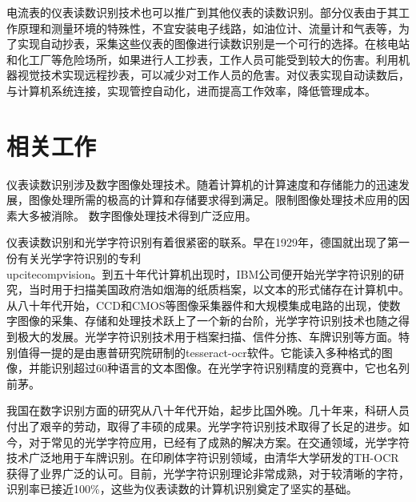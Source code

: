 电流表的仪表读数识别技术也可以推广到其他仪表的读数识别。部分仪表由于其工作原理和测量环境的特殊性，不宜安装电子线路，如油位计、流量计和气表等，为了实现自动抄表，采集这些仪表的图像进行读数识别是一个可行的选择。在核电站和化工厂等危险场所，如果进行人工抄表，工作人员可能受到较大的伤害。利用机器视觉技术实现远程抄表，可以减少对工作人员的危害。对仪表实现自动读数后，与计算机系统连接，实现管控自动化，进而提高工作效率，降低管理成本。

\section{相关工作}

仪表读数识别涉及数字图像处理技术。随着计算机的计算速度和存储能力的迅速发展，图像处理所需的极高的计算和存储要求得到满足。限制图像处理技术应用的因素大多被消除。 数字图像处理技术得到广泛应用。

仪表读数识别和光学字符识别有着很紧密的联系。早在1929年，德国就出现了第一份有关光学字符识别的专利\\upcite{compvision}。到五十年代计算机出现时，IBM公司便开始光学字符识别的研究，当时用于扫描美国政府浩如烟海的纸质档案，以文本的形式储存在计算机中。从八十年代开始，CCD和CMOS等图像采集器件和大规模集成电路的出现，使数字图像的采集、存储和处理技术跃上了一个新的台阶，光学字符识别技术也随之得到极大的发展。光学字符识别技术用于档案扫描、信件分拣、车牌识别等方面。特别值得一提的是由惠普研究院研制的tesseract-ocr软件。它能读入多种格式的图像，并能识别超过60种语言的文本图像。在光学字符识别精度的竞赛中，它也名列前茅。

我国在数字识别方面的研究从八十年代开始，起步比国外晚。几十年来，科研人员付出了艰辛的劳动，取得了丰硕的成果。光学字符识别技术取得了长足的进步。如今，对于常见的光学字符应用，已经有了成熟的解决方案。在交通领域，光学字符技术广泛地用于车牌识别。在印刷体字符识别领域，由清华大学研发的TH-OCR获得了业界广泛的认可。目前，光学字符识别理论非常成熟，对于较清晰的字符，识别率已接近100\%，这些为仪表读数的计算机识别奠定了坚实的基础。

